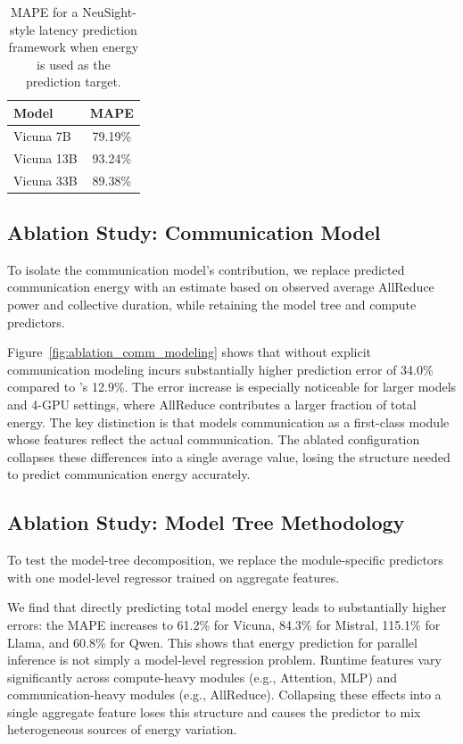 \begin{table}[t]
\centering
\small
\setlength{\tabcolsep}{6pt}
\renewcommand{\arraystretch}{1.05}
\begin{tabular}{lc}
\toprule
\textbf{Model} & \textbf{MAPE} \\
\midrule
\rowcolor{rowblue} Vicuna 7B  & 79.19\% \\
Vicuna 13B                    & 93.24\% \\
\rowcolor{rowblue} Vicuna 33B & 89.38\% \\
\bottomrule
\end{tabular}
\vspace{5pt}
\caption{MAPE for a NeuSight-style latency prediction framework when energy is used as the prediction target.}
\label{tab:neusight_energy_target}
\vspace{-5pt}
\end{table}

\subsection{Ablation Study: Communication Model}
\label{sec:ablation_comm_modeling}
To isolate the communication model's contribution, we replace predicted communication energy with an estimate based on observed average AllReduce power and collective duration, while retaining the model tree and compute predictors.



Figure~\ref{fig:ablation_comm_modeling} shows that \sys{} without explicit communication modeling incurs substantially higher prediction error of 34.0\% compared to \sys{}'s 12.9\%.
The error increase is especially noticeable for larger models and 4-GPU settings, where AllReduce contributes a larger fraction of total energy.
The key distinction is that \sys{} models communication as a first-class module whose features reflect the actual communication.
The ablated configuration collapses these differences into a single average value, losing the structure needed to predict communication energy accurately.

\subsection{Ablation Study: Model Tree Methodology}
\label{sec:ablation}
To test the model-tree decomposition, we replace the module-specific predictors with one model-level regressor trained on aggregate features.

We find that directly predicting total model energy leads to substantially higher errors: the MAPE increases to 61.2\% for Vicuna, 84.3\% for Mistral, 115.1\% for Llama, and 60.8\% for Qwen.
This shows that energy prediction for parallel inference is not simply a model-level regression problem. Runtime features vary significantly across compute-heavy modules (e.g., Attention, MLP) and communication-heavy modules (e.g., AllReduce). Collapsing these effects into a single aggregate feature loses this structure and causes the predictor to mix heterogeneous sources of energy variation.

